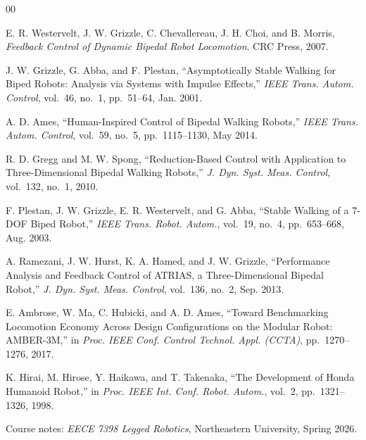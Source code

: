 \documentclass[conference]{IEEEtran}
\begin{document}
\begin{thebibliography}{00}

E. R. Westervelt, J. W. Grizzle, C. Chevallereau, J. H. Choi, and B. Morris,
\textit{Feedback Control of Dynamic Bipedal Robot Locomotion}.
CRC Press, 2007.

J. W. Grizzle, G. Abba, and F. Plestan,
``Asymptotically Stable Walking for Biped Robots: Analysis via Systems with Impulse Effects,''
\textit{IEEE Trans. Autom. Control}, vol.~46, no.~1, pp.~51--64, Jan. 2001.

A. D. Ames,
``Human-Inspired Control of Bipedal Walking Robots,''
\textit{IEEE Trans. Autom. Control}, vol.~59, no.~5, pp.~1115--1130, May 2014.

R. D. Gregg and M. W. Spong,
``Reduction-Based Control with Application to Three-Dimensional Bipedal Walking Robots,''
\textit{J. Dyn. Syst. Meas. Control}, vol.~132, no.~1, 2010.

F. Plestan, J. W. Grizzle, E. R. Westervelt, and G. Abba,
``Stable Walking of a 7-DOF Biped Robot,''
\textit{IEEE Trans. Robot. Autom.}, vol.~19, no.~4, pp.~653--668, Aug. 2003.

A. Ramezani, J. W. Hurst, K. A. Hamed, and J. W. Grizzle,
``Performance Analysis and Feedback Control of ATRIAS, a Three-Dimensional Bipedal Robot,''
\textit{J. Dyn. Syst. Meas. Control}, vol.~136, no.~2, Sep. 2013.

E. Ambrose, W. Ma, C. Hubicki, and A. D. Ames,
``Toward Benchmarking Locomotion Economy Across Design Configurations on the Modular Robot: AMBER-3M,''
in \textit{Proc. IEEE Conf. Control Technol. Appl. (CCTA)}, pp.~1270--1276, 2017.

K. Hirai, M. Hirose, Y. Haikawa, and T. Takenaka,
``The Development of Honda Humanoid Robot,''
in \textit{Proc. IEEE Int. Conf. Robot. Autom.}, vol.~2, pp.~1321--1326, 1998.

Course notes: \textit{EECE 7398 Legged Robotics}, Northeastern University, Spring 2026.

\end{thebibliography}
\end{document}
